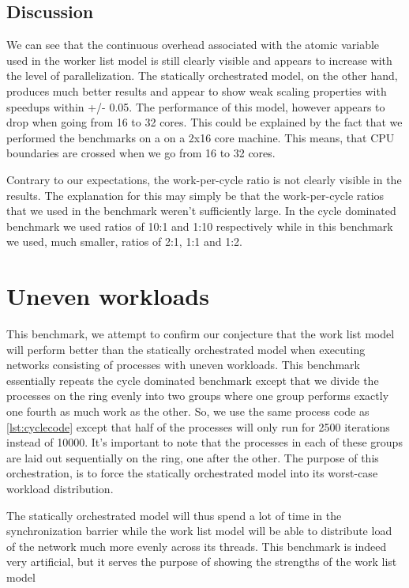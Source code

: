\subsection{Discussion}
We can see that the continuous overhead associated with the atomic variable used in
the worker list model is still clearly visible and appears to
increase with the level of parallelization. The statically
orchestrated model, on the other hand, produces much better results
and appear to show weak scaling properties with speedups within +/-
0.05. The performance of this model, however appears to drop when
going from 16 to 32 cores. This could be explained by the fact that we
performed the benchmarks on a on a 2x16 core machine. This means, that
CPU boundaries are crossed when we go from 16 to 32 cores.

Contrary to our expectations, the work-per-cycle ratio is not clearly
visible in the results. The explanation for this may simply be that
the work-per-cycle ratios that we used in the benchmark weren't
sufficiently large. In the cycle dominated benchmark we used ratios of
10:1 and 1:10 respectively while in this benchmark we used, much
smaller, ratios of
2:1, 1:1 and 1:2.


\section{Uneven workloads}
This benchmark, we attempt to confirm our conjecture that the work
list model will perform better than the statically orchestrated model
when executing networks consisting of processes with uneven
workloads. This benchmark essentially repeats the cycle dominated
benchmark except that we divide the processes on the ring evenly into
two groups where one group performs exactly one fourth as much work as
the other. So, we use the same process code as \cref{lst:cyclecode}
except that half of the processes will only run for 2500 iterations
instead of 10000. It's important to note that the processes in each of
these groups are laid out sequentially on the ring, one after the
other. The purpose of this orchestration, is to force the statically
orchestrated model into its worst-case workload distribution.

The statically orchestrated model will thus spend a lot of time in the
synchronization barrier while the work list model will be able to
distribute load of the network much more evenly across its
threads. This benchmark is indeed very artificial, but it serves the
purpose of showing the strengths of the work list model

